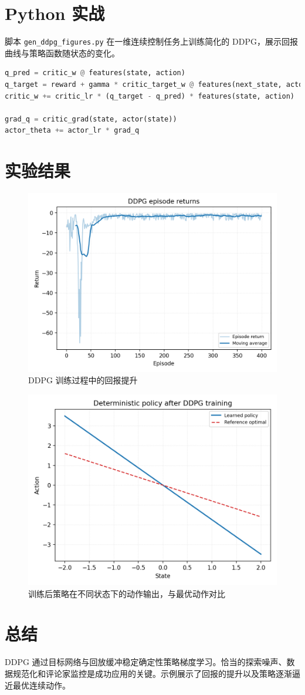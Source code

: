\documentclass[UTF8,zihao=-4]{ctexart}
\begin{document}
\section{Python 实战}
脚本 \texttt{gen\_ddpg\_figures.py} 在一维连续控制任务上训练简化的 DDPG，展示回报曲线与策略函数随状态的变化。
\begin{lstlisting}[language=Python,caption={脚本 gen_ddpg_figures.py 片段}]
q_pred = critic_w @ features(state, action)
q_target = reward + gamma * critic_target_w @ features(next_state, actor_target(next_state))
critic_w += critic_lr * (q_target - q_pred) * features(state, action)

grad_q = critic_grad(state, actor(state))
actor_theta += actor_lr * grad_q
\end{lstlisting}

\section{实验结果}
\begin{figure}[H]
  \centering
  \includegraphics[width=0.8\linewidth]{ddpg_returns.png}
  \caption{DDPG 训练过程中的回报提升}
  \label{fig:ddpg_returns_cn}
\end{figure}

\begin{figure}[H]
  \centering
  \includegraphics[width=0.82\linewidth]{ddpg_policy_trace.png}
  \caption{训练后策略在不同状态下的动作输出，与最优动作对比}
  \label{fig:ddpg_policy_trace_cn}
\end{figure}

\FloatBarrier
\section{总结}
DDPG 通过目标网络与回放缓冲稳定确定性策略梯度学习。恰当的探索噪声、数据规范化和评论家监控是成功应用的关键。示例展示了回报的提升以及策略逐渐逼近最优连续动作。
\end{document}
